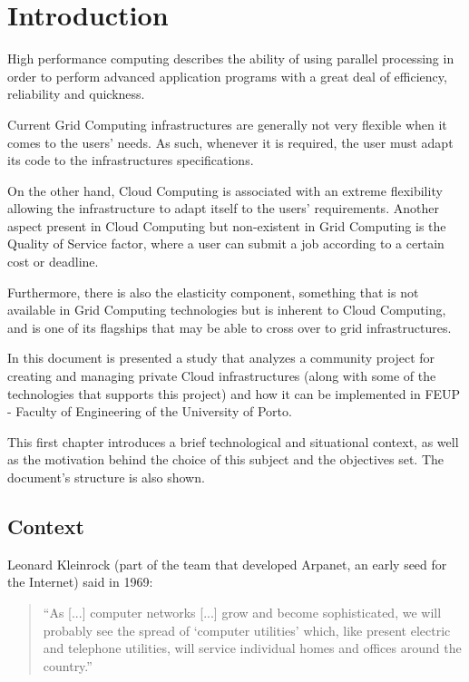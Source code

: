 \chapter{Introduction} \label{chap:intro}

High performance computing describes the ability of using parallel processing in order to perform advanced application programs with a great deal of efficiency, reliability and quickness. \cite{hpclinux}

Current Grid Computing infrastructures are generally not very flexible when it comes to the users' needs. As such, whenever it is required, the user must adapt its code to the infrastructures specifications.

On the other hand, Cloud Computing is associated with an extreme flexibility allowing the infrastructure to adapt itself to the users' requirements. Another aspect present in Cloud Computing but non-existent in Grid Computing is the Quality of Service factor, where a user can submit a job according to a certain cost or deadline.

Furthermore, there is also the elasticity component, something that is not available in Grid Computing technologies but is inherent to Cloud Computing, and is one of its flagships that may be able to cross over to grid infrastructures.

In this document is presented a study that analyzes a community project for creating and managing private Cloud infrastructures (along with some of the technologies that supports this project) and how it can be implemented in FEUP - Faculty of Engineering of the University of Porto.

This first chapter introduces a brief technological and situational context, as well as the motivation behind the choice of this subject and the objectives set. The document's structure is also shown.

\section{Context} \label{sec:context}

Leonard Kleinrock (part of the team that developed Arpanet, an early seed for the Internet) said in 1969:

\begin{quote}
  ``As [...] computer networks [...] grow and become sophisticated, we will probably see the spread of `computer utilities' which, like present electric and telephone utilities, will service individual homes and offices around the country.''~\cite{Buyya2009599} 
\end{quote}
	
